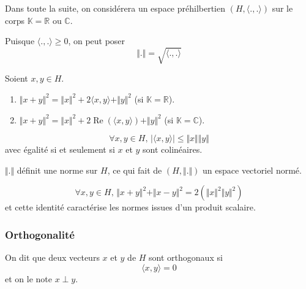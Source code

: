   Dans toute la suite, on considérera un espace préhilbertien $(H, \langle ., . \rangle)$ sur le corps $\mathbb{K} = \mathbb{R} \text{ ou } \mathbb{C}$.

  \begin{notation}
    Puisque $\langle ., . \rangle \geq 0$, on peut poser
    \[ \Vert . \Vert = \sqrt{\langle ., . \rangle} \]
  \end{notation}

  \begin{proposition}
    \label{213-1}
    Soient $x, y \in H$.
    \begin{enumerate}[label=(\roman*)]
      \item $\Vert x + y \Vert^2 = \Vert x \Vert^2 + 2 \langle x, y \rangle + \Vert y \Vert^2$ (si $\mathbb{K} = \mathbb{R}$).
      \item $\Vert x + y \Vert^2 = \Vert x \Vert^2 + 2 \operatorname{Re}(\langle x, y \rangle) + \Vert y \Vert^2$ (si $\mathbb{K} = \mathbb{C}$).
    \end{enumerate}
  \end{proposition}

  \begin{theorem}
    \[ \forall x, y \in H, \, \vert \langle x, y \rangle \vert \leq \Vert x \Vert \Vert y \Vert \]
    avec égalité si et seulement si $x$ et $y$ sont colinéaires.
  \end{theorem}

  \begin{corollary}
    $\Vert . \Vert$ définit une norme sur $H$, ce qui fait de $(H, \Vert . \Vert)$ un espace vectoriel normé.
  \end{corollary}


  \begin{proposition}
    \[ \forall x, y \in H, \, \Vert x + y \Vert^2 + \Vert x - y \Vert^2 = 2(\Vert x \Vert^2 \Vert y \Vert^2) \]
    et cette identité caractérise les normes issues d'un produit scalaire.
  \end{proposition}

  \subsubsection{Orthogonalité}


  \begin{definition}
    On dit que deux vecteurs $x$ et $y$ de $H$ sont orthogonaux si
    \[ \langle x, y \rangle = 0 \]
    et on le note $x \perp y$.
  \end{definition}

